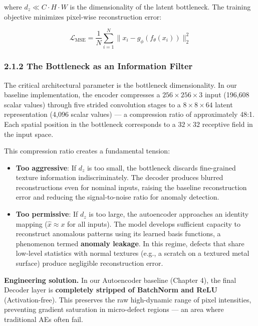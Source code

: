 \documentclass[12pt, a4paper, oneside]{report}
\begin{document}
where \(d_z \ll C \cdot H \cdot W\) is the dimensionality of the latent bottleneck. The training objective minimizes pixel-wise reconstruction error:

\[\mathcal{L}_{\text{MSE}} = \frac{1}{N} \sum_{i=1}^{N} \| x_i - g_\phi(f_\theta(x_i)) \|_2^2\]

\subsubsection{2.1.2 The Bottleneck as an Information Filter}\label{the-bottleneck-as-an-information-filter}

The critical architectural parameter is the bottleneck dimensionality. In our baseline implementation, the encoder compresses a \(256 \times 256 \times 3\) input (196,608 scalar values) through five strided convolution stages to a \(8 \times 8 \times 64\) latent representation (4,096 scalar values) --- a compression ratio of approximately 48:1. Each spatial position in the bottleneck corresponds to a \(32 \times 32\) receptive field in the input space.

This compression ratio creates a fundamental tension:

\begin{itemize}
\item
  \textbf{Too aggressive}: If \(d_z\) is too small, the bottleneck discards fine-grained texture information indiscriminately. The decoder produces blurred reconstructions even for nominal inputs, raising the baseline reconstruction error and reducing the signal-to-noise ratio for anomaly detection.
\item
  \textbf{Too permissive}: If \(d_z\) is too large, the autoencoder approaches an identity mapping (\(\hat{x} \approx x\) for all inputs). The model develops sufficient capacity to reconstruct anomalous patterns using its learned basis functions, a phenomenon termed \textbf{anomaly leakage}. In this regime, defects that share low-level statistics with normal textures (e.g., a scratch on a textured metal surface) produce negligible reconstruction error.
\end{itemize}

\textbf{Engineering solution.} In our Autoencoder baseline (Chapter 4), the final Decoder layer is \textbf{completely stripped of BatchNorm and ReLU} (Activation-free). This preserves the raw high-dynamic range of pixel intensities, preventing gradient saturation in micro-defect regions --- an area where traditional AEs often fail.
\end{document}
